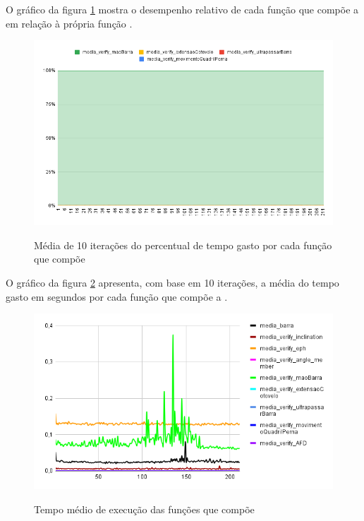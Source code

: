 O gráfico da figura \ref{graf:G12} mostra o desempenho relativo de cada função que compõe a  em relação à própria função .

\begin{figure}[H]
	\centering
	\caption{ Média de 10 iterações do percentual de tempo gasto por cada função que compõe  }
	\includegraphics[scale=0.6]{figuras/grafico/comp_char_AFD.png}
	\label{graf:G12}
\end{figure}




O gráfico da figura \ref{graf:G13} apresenta, com base em 10 iterações, a média do tempo gasto em segundos por cada função que compõe a .

\begin{figure}[H]
	\centering
	\caption{Tempo médio de execução das funções que compõe }
	\includegraphics[scale=0.7]{figuras/grafico/comp_process_cell_2.png}
	\label{graf:G13}
\end{figure}


